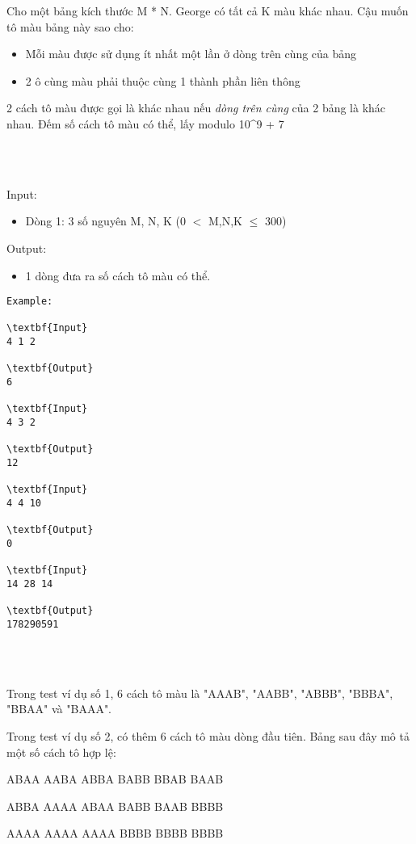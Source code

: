 

Cho một bảng kích thước M * N. George có tất cả K màu khác nhau. Cậu muốn tô màu bảng này sao cho:
\begin{itemize}
	\item 

Mỗi màu được sử dụng ít nhất một lần ở dòng trên cùng của bảng
	\item 

2 ô cùng màu phải thuộc cùng 1 thành phần liên thông
\end{itemize}

2 cách tô màu được gọi là khác nhau nếu \emph{ dòng trên cùng } của 2 bảng là khác nhau. Đếm số cách tô màu có thể, lấy modulo 10\textasciicircum9 + 7


\\ 

Input:
\begin{itemize}
	\item 

Dòng 1: 3 số nguyên M, N, K (0 $<$ M,N,K  $\le$  300)
\end{itemize}

Output:
\begin{itemize}
	\item 

1 dòng đưa ra số cách tô màu có thể.
\end{itemize}
\begin{verbatim}
Example:

\textbf{Input}
4 1 2

\textbf{Output}
6

\textbf{Input}
4 3 2

\textbf{Output}
12

\textbf{Input}
4 4 10

\textbf{Output}
0

\textbf{Input}
14 28 14

\textbf{Output}
178290591\end{verbatim}


\\ 

Trong test ví dụ số 1, 6 cách tô màu là "AAAB", "AABB", "ABBB", "BBBA", "BBAA" và "BAAA".

Trong test ví dụ số 2, có thêm 6 cách tô màu dòng đầu tiên. Bảng sau đây mô tả một số cách tô hợp lệ:

ABAA AABA ABBA BABB BBAB BAAB

ABBA AAAA ABAA BABB BAAB BBBB

AAAA AAAA AAAA BBBB BBBB BBBB


\\ 
